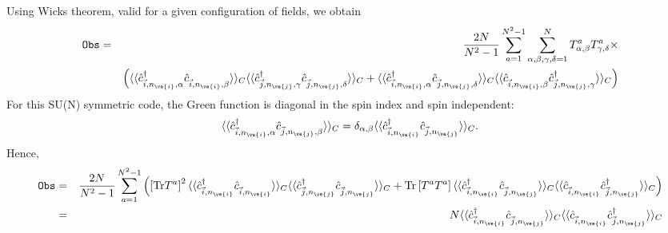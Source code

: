 Using   Wicks theorem,  valid for a given  configuration of   fields,  we  obtain
\begin{eqnarray}
 \texttt{Obs} =   & & \frac{2N}{N^2-1}\sum_{a=1}^{N^2 - 1}   \sum_{\alpha,\beta,\gamma, \delta = 1}^{N}     T^a_{\alpha,\beta}  T^a_{\gamma,\delta}   \times 
  \nonumber  \\
& &   
  \left( \langle \langle \hat{c}^{\dagger}_{\vec{i},n_{\ve{i}},\alpha} \hat{c}^{\phantom\dagger}_{\vec{i},n_{\ve{i}}, \beta }  \rangle\rangle_C  \langle \langle     \hat{c}^{\dagger}_{\vec{j}, n_{\ve{j}},\gamma}  \hat{c}^{\phantom\dagger}_{\vec{j},n_{\ve{j}},\delta}\rangle\rangle_C        +  
  \langle \langle \hat{c}^{\dagger}_{\vec{i},  n_{\ve{i}},\alpha}   \hat{c}^{\phantom\dagger}_{\vec{j},  n_{\ve{j}},\delta}\rangle\rangle_C  \langle \langle   \hat{c}^{\phantom\dagger}_{\vec{i},   n_{\ve{i}}, \beta }   \hat{c}^{\dagger}_{\vec{j},   n_{\ve{j}}, \gamma} \rangle\rangle_C 
   \right)    
\end{eqnarray}
For this  SU(N)  symmetric  code, the  Green function  is diagonal  in the spin  index and spin independent: 
\begin{equation}
 \langle \langle \hat{c}^{\dagger}_{\vec{i},  n_{\ve{i}},\alpha} \hat{c}^{}_{\vec{j},  n_{\ve{j}}, \beta }  \rangle\rangle_C  =  \delta_{\alpha,\beta}  \langle \langle \hat{c}^{\dagger}_{\vec{i},  n_{\ve{i}}} \hat{c}^{}_{\vec{j} ,  n_{\ve{j}}}  \rangle\rangle_C.
\end{equation}
Hence, 
\begin{eqnarray}
 \texttt{Obs} =   & & \frac{2N}{N^2-1}\sum_{a=1}^{N^2 - 1} \left(   
\left[   \text{Tr} T^{a}\right]^2 \langle \langle \hat{c}^{\dagger}_{\vec{i},  n_{\ve{i}} } \hat{c}^{\phantom\dagger}_{\vec{i} ,  n_{\ve{i}}}  \rangle\rangle_C       \langle \langle \hat{c}^{\dagger}_{\vec{j} ,  n_{\ve{j}}} \hat{c}^{\phantom\dagger}_{\vec{j} ,  n_{\ve{j}}}  \rangle\rangle_C 
 +   \text{Tr}\left[ T^{a}  T^{a} \right]    \langle \langle \hat{c}^{\dagger}_{\vec{i},  n_{\ve{i}}}   \hat{c}^{\phantom\dagger}_{\vec{j},  n_{\ve{j}}}\rangle\rangle_C  \langle \langle   \hat{c}^{\phantom\dagger}_{\vec{i},  n_{\ve{i}}}   \hat{c}^{\dagger}_{\vec{j},  n_{\ve{j}}} \rangle\rangle_C  \right)   
 \nonumber \\
= & &    N       \langle \langle \hat{c}^{\dagger}_{\vec{i},  n_{\ve{i}}}   \hat{c}^{\phantom\dagger}_{\vec{j},  n_{\ve{j}}}\rangle\rangle_C  \langle \langle   \hat{c}^{\phantom\dagger}_{\vec{i},  n_{\ve{i}}}   \hat{c}^{\dagger}_{\vec{j},  n_{\ve{j}}} \rangle\rangle_C   
\end{eqnarray}
